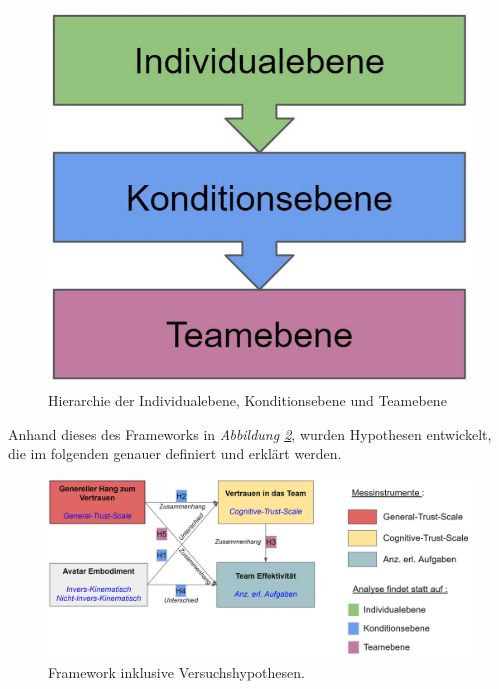 \documentclass[a4paper,11pt]{article}%
\renewcommand{\\}{\vspace*{0.5\baselineskip} \newline}
\begin{document}
\begin{figure}[H]
		\begin{footnotesize}
		\centering
			\includegraphics[scale=0.4]{Abbildungen/DifferentLevels.JPG}	
			\caption[Die Hierarchieebenen]{Hierarchie der Individualebene, Konditionsebene und Teamebene}
			\label{DifferentLevels}
		\end{footnotesize}
	\end{figure}

Anhand dieses des Frameworks in \textit{Abbildung \ref{Versuchshypothesen}}, wurden Hypothesen entwickelt, die im folgenden genauer definiert und erklärt werden.

\begin{figure}[H]
		\begin{footnotesize}
			\includegraphics[width=\textwidth]{Abbildungen/Versuchshypothesen_02.JPG}		
			\caption[Das Framework der Versuchshypothesen]{Framework inklusive Versuchshypothesen.}
			\label{Versuchshypothesen}
		\end{footnotesize}
	\end{figure}	
\end{document}
